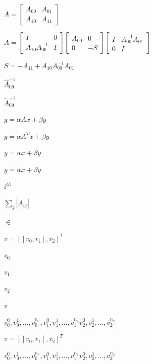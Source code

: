 \documentclass{article}
\begin{document}
$A = \left[
\begin{array}{cc}
A_{00} & A_{01} \\
A_{10} & A_{11}
\end{array}
\right]
$
\pagebreak

$A = \left[
\begin{array}{cc}
I & 0  \\
A_{10} A_{00}^{-1} & I
\end{array}
\right]
\left[
\begin{array}{cc}
A_{00} & 0  \\
0 & -S
\end{array}
\right]
\left[
\begin{array}{cc}
I &  A_{00}^{-1} A_{01} \\
0 & I
\end{array}
\right]
$
\pagebreak

$S = -A_{11} + A_{10} A_{00}^{-1} A_{01}$
\pagebreak

$\hat{A}_{00}^{-1}$
\pagebreak

$\tilde{A}_{00}^{-1}$
\pagebreak

$ y = \alpha A x + \beta y $
\pagebreak

$ y = \alpha A^T x + \beta y $
\pagebreak

$y = \alpha x+\beta y$
\pagebreak

$y=\alpha x + \beta y$
\pagebreak

$i^{th}$
\pagebreak

$\sum_j |A_{ij}|$
\pagebreak

$\in$
\pagebreak

$v = [ [v_0, v_1] ,
v_2]^T$
\pagebreak

$v_0$
\pagebreak

$v_1$
\pagebreak

$v_2$
\pagebreak

$v$
\pagebreak

$v_0^0, v_0^1,\ldots,v_0^{n_0},
     v_1^0, v_1^1,\ldots,v_1^{n_1}
     v_2^0, v_2^1,\ldots,v_2^{n_2} $
\pagebreak

$v = [ [v_0, v_1] , v_2]^T$
\pagebreak

$v_0^0, v_0^1,\ldots,v_0^{n_0},
   v_1^0, v_1^1,\ldots,v_1^{n_1}
   v_2^0, v_2^1,\ldots,v_2^{n_2} $
\pagebreak
\end{document}
